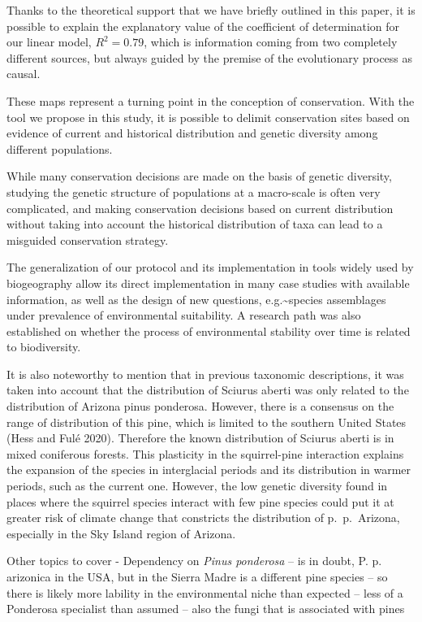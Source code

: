 \documentclass[
]{article}
\begin{document}
Thanks to the theoretical support that we have briefly outlined in this
paper, it is possible to explain the explanatory value of the
coefficient of determination for our linear model, \(R^{2} = 0.79\),
which is information coming from two completely different sources, but
always guided by the premise of the evolutionary process as causal.

These maps represent a turning point in the conception of conservation.
With the tool we propose in this study, it is possible to delimit
conservation sites based on evidence of current and historical
distribution and genetic diversity among different populations.

While many conservation decisions are made on the basis of genetic
diversity, studying the genetic structure of populations at a
macro-scale is often very complicated, and making conservation decisions
based on current distribution without taking into account the historical
distribution of taxa can lead to a misguided conservation strategy.

The generalization of our protocol and its implementation in tools
widely used by biogeography allow its direct implementation in many case
studies with available information, as well as the design of new
questions, e.g.\textasciitilde species assemblages under prevalence of
environmental suitability. A research path was also established on
whether the process of environmental stability over time is related to
biodiversity.

It is also noteworthy to mention that in previous taxonomic
descriptions, it was taken into account that the distribution of Sciurus
aberti was only related to the distribution of Arizona pinus ponderosa.
However, there is a consensus on the range of distribution of this pine,
which is limited to the southern United States (Hess and Fulé 2020).
Therefore the known distribution of Sciurus aberti is in mixed
coniferous forests. This plasticity in the squirrel-pine interaction
explains the expansion of the species in interglacial periods and its
distribution in warmer periods, such as the current one. However, the
low genetic diversity found in places where the squirrel species
interact with few pine species could put it at greater risk of climate
change that constricts the distribution of p.~p.~Arizona, especially in
the Sky Island region of Arizona.

Other topics to cover
- Dependency on \textit{Pinus ponderosa} -- is in doubt, P. p. arizonica in the USA, but in the Sierra Madre is a different pine species -- so there is likely more lability in the environmental niche than expected -- less of a Ponderosa specialist than assumed -- also the fungi that is associated with pines
\end{document}
